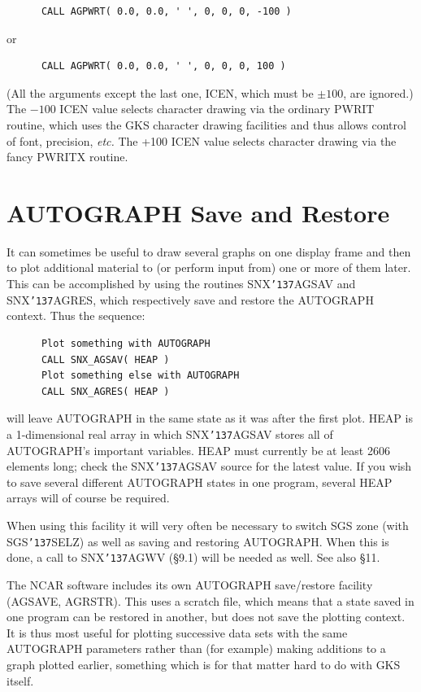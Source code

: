 \documentclass[11pt]{article}
\renewcommand{\_}{{\tt\char'137}}     %
\begin{document}
\begin{verbatim}
      CALL AGPWRT( 0.0, 0.0, ' ', 0, 0, 0, -100 )
\end{verbatim}

or

\begin{verbatim}
      CALL AGPWRT( 0.0, 0.0, ' ', 0, 0, 0, 100 )
\end{verbatim}

(All the arguments except the last one, ICEN, which must be $\pm100$,
are ignored.)
The $-100$ ICEN value selects character drawing via
the ordinary PWRIT routine, which uses the GKS character drawing
facilities and thus allows control of font, precision, {\em etc.}
The +100 ICEN value selects character drawing via the fancy PWRITX routine.


\section {AUTOGRAPH Save and Restore}

It can sometimes be useful to draw several graphs on one
display frame and then to plot additional material to (or
perform input from) one or more of them later.
This can be accomplished by using the
routines SNX\_AGSAV and SNX\_AGRES, which respectively
save and restore the AUTOGRAPH context.  Thus the sequence:

\begin{verbatim}
      Plot something with AUTOGRAPH
      CALL SNX_AGSAV( HEAP )
      Plot something else with AUTOGRAPH
      CALL SNX_AGRES( HEAP )
\end{verbatim}

will leave AUTOGRAPH in the same state as it was after the first plot.
HEAP is a 1-dimensional real array in which SNX\_AGSAV stores
all of AUTOGRAPH's important variables.
HEAP must currently be at least 2606 elements long;
check the SNX\_AGSAV source for the latest value.
If you wish to save several different AUTOGRAPH states in
one program, several HEAP arrays will of course be required.

When using this facility it will very often be necessary to switch SGS zone
(with SGS\_SELZ) as well as saving and restoring AUTOGRAPH.
When this is done, a call to SNX\_AGWV (\S 9.1) will be needed as well.
See also \S 11.

The NCAR software includes its own AUTOGRAPH save/restore facility (AGSAVE,
AGRSTR).
This uses a scratch file, which means that a state saved in one program can be
restored in another, but does not save the plotting context.
It is thus most useful for plotting successive data sets with the same
AUTOGRAPH parameters rather than (for example) making additions to a graph
plotted earlier, something which is for that matter hard to do with GKS itself.
\end{document}
